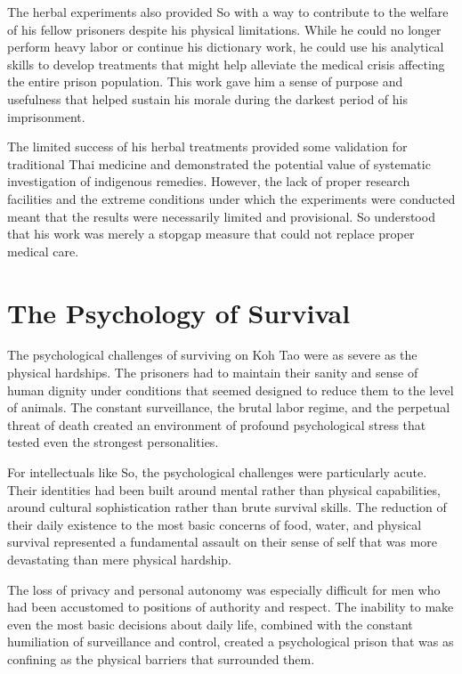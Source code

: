 \documentclass[
  Letterpaper,
]{scrbook}
\begin{document}
The herbal experiments also provided So with a way to contribute to the
welfare of his fellow prisoners despite his physical limitations. While
he could no longer perform heavy labor or continue his dictionary work,
he could use his analytical skills to develop treatments that might help
alleviate the medical crisis affecting the entire prison population.
This work gave him a sense of purpose and usefulness that helped sustain
his morale during the darkest period of his imprisonment.

The limited success of his herbal treatments provided some validation
for traditional Thai medicine and demonstrated the potential value of
systematic investigation of indigenous remedies. However, the lack of
proper research facilities and the extreme conditions under which the
experiments were conducted meant that the results were necessarily
limited and provisional. So understood that his work was merely a
stopgap measure that could not replace proper medical care.

\section{The Psychology of Survival}\label{the-psychology-of-survival}

The psychological challenges of surviving on Koh Tao were as severe as
the physical hardships. The prisoners had to maintain their sanity and
sense of human dignity under conditions that seemed designed to reduce
them to the level of animals. The constant surveillance, the brutal
labor regime, and the perpetual threat of death created an environment
of profound psychological stress that tested even the strongest
personalities.

For intellectuals like So, the psychological challenges were
particularly acute. Their identities had been built around mental rather
than physical capabilities, around cultural sophistication rather than
brute survival skills. The reduction of their daily existence to the
most basic concerns of food, water, and physical survival represented a
fundamental assault on their sense of self that was more devastating
than mere physical hardship.

The loss of privacy and personal autonomy was especially difficult for
men who had been accustomed to positions of authority and respect. The
inability to make even the most basic decisions about daily life,
combined with the constant humiliation of surveillance and control,
created a psychological prison that was as confining as the physical
barriers that surrounded them.
\end{document}
